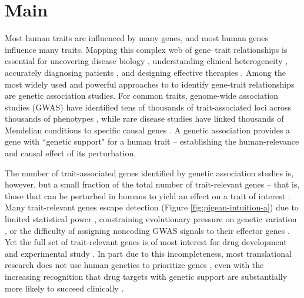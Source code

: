 \section{Main}\label{sec:introduction}


Most human traits are influenced by many genes, and most human genes influence many traits. Mapping this complex web of gene–trait relationships is essential for uncovering disease biology \cite{cohen_sequence_2006}, understanding clinical heterogeneity \cite{udler_type_2018}, accurately diagnosing patients \cite{yang_clinical_2013}, and designing effective therapies \cite{plenge_validating_2013}. Among the most widely used and powerful approaches to to identify gene-trait relationships are genetic association studies. For common traits, genome-wide association studies (GWAS) have identified tens of thousands of trait-associated loci across thousands of phenotypes \cite{abdellaoui_15_2023}, while rare disease studies have linked thousands of Mendelian conditions to specific causal genes \cite{chung_meta-analysis_2023}. A genetic association provides a gene with ``genetic support" for a human trait -- establishing the human-relevance and causal effect of its perturbation.

The number of trait-associated genes identified by genetic association studies is, however, but a small fraction of the total number of trait-relevant genes -- that is, those that can be perturbed in humans to yield an effect on a trait of interest \cite{finan_druggable_2017}. Many trait-relevant genes escape detection (Figure \ref{fig:pigean-intuition-a}) due to limited statistical power \cite{wang_statistical_2019}, constraining evolutionary pressure on genetic variation \cite{gazal_linkage_2017}, or the difficulty of assigning noncoding GWAS signals to their effector genes  \cite{schipper_demystifying_2022,costanzo_realizing_2025}. Yet the full set of trait-relevant genes is of most interest for drug development and experimental study \cite{jhamb_pathway_2019,macnamara_network_2020}. In part due to this incompleteness, most translational research does not use human genetics to prioritize genes \cite{wehling_assessing_2009,dornbos_evaluating_2022}, even with the  increasing recognition that drug targets with genetic support are substantially more likely to succeed clinically \cite{plenge_validating_2013,minikel_refining_2024}. 

